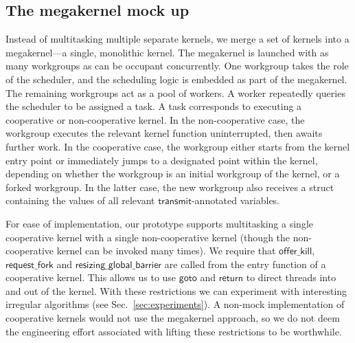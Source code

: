 \documentclass[sigconf]{acmart}
\newcommand{\kernelmerge}{\textsc{KernelMerge}}
\newcommand{\mysec}{Sec.~}
\newcommand{\transmit}{\mathsf{transmit}}
\newcommand{\offerfork}{\mathsf{request\_fork}}
\newcommand{\offerkill}{\mathsf{offer\_kill}}
\newcommand{\resizingglobalbarrier}{\mathsf{resizing\_global\_barrier}}
\newcommand{\keyword}[1]{\mathsf{#1}}
\begin{document}
{\subsection{The megakernel mock up}\label{sec:megakernel}

Instead of multitasking multiple separate kernels, we merge a set of
kernels into a megakernel---a single, monolithic kernel.  The
megakernel is launched with as many workgroups as can be occupant
concurrently.  One workgroup takes the role of the scheduler, and the
scheduling logic is embedded as part of the megakernel.  The remaining
workgroups act as a pool of workers.  A worker repeatedly queries the
scheduler to be assigned a task.  A task corresponds to executing a
cooperative or non-cooperative kernel.  In the non-cooperative case,
the workgroup executes the relevant kernel function uninterrupted,
then awaits further work.  In the cooperative case, the workgroup
either starts from the kernel entry point or immediately jumps to a
designated point within the kernel, depending on whether the workgroup
is an initial workgroup of the kernel, or a forked workgroup.  In the
latter case, the new workgroup also receives a struct containing the
values of all relevant $\transmit$-annotated variables.

%
For ease of implementation, our prototype supports multitasking a
single cooperative kernel with a single non-cooperative kernel (though
the non-cooperative kernel can be invoked many times).
We require that $\offerkill$, $\offerfork$ and
$\resizingglobalbarrier$ are called from the entry function of a
cooperative kernel.  This allows us to use $\keyword{goto}$ and
$\keyword{return}$ to direct threads into and out of the kernel.  With
these restrictions we can experiment with interesting irregular
algorithms (see \mysec\ref{sec:experiments}).  A non-mock
implementation of cooperative kernels would not use the megakernel
approach, so we do not deem the engineering effort associated with
lifting these restrictions to be worthwhile.

%

}
\end{document}

